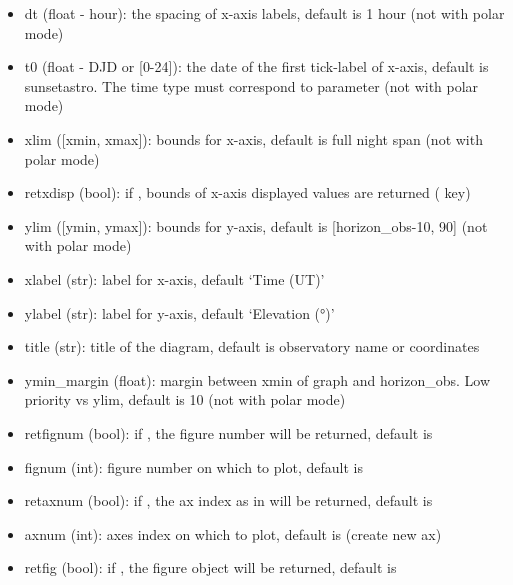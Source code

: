 \documentclass[letterpaper,10pt,english]{sphinxmanual}
\begin{document}
\begin{fulllineitems}
\begin{fulllineitems}
\begin{description}
\begin{itemize}
\item {} 
dt (float - hour): the spacing of x-axis labels, default is 1 hour (not with polar mode)

\item {} 
t0 (float - DJD or {[}0-24{]}): the date of the first tick-label of x-axis, default is sunsetastro. The time type must correspond to  parameter (not with polar mode)

\item {} 
xlim ({[}xmin, xmax{]}): bounds for x-axis, default is full night span (not with polar mode)

\item {} 
retxdisp (bool): if , bounds of x-axis displayed values are returned ( key)

\item {} 
ylim ({[}ymin, ymax{]}): bounds for y-axis, default is {[}horizon\_obs-10, 90{]} (not with polar mode)

\item {} 
xlabel (str): label for x-axis, default `Time (UT)'

\item {} 
ylabel (str): label for y-axis, default `Elevation (°)'

\item {} 
title (str): title of the diagram, default is observatory name or coordinates

\item {} 
ymin\_margin (float): margin between xmin of graph and horizon\_obs. Low priority vs ylim, default is 10 (not with polar mode)

\item {} 
retfignum (bool): if , the figure number will be returned, default is 

\item {} 
fignum (int): figure number on which to plot, default is 

\item {} 
retaxnum (bool): if , the ax index as in  will be returned, default is 

\item {} 
axnum (int): axes index on which to plot, default is  (create new ax)

\item {} 
retfig (bool): if , the figure object will be returned, default is 


\end{itemize}
\end{description}
\end{fulllineitems}
\end{fulllineitems}
\end{document}
